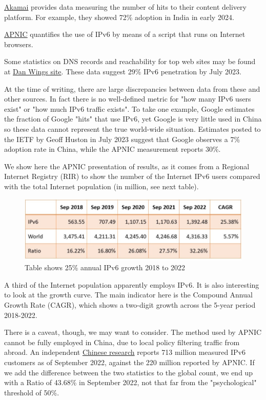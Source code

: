 \documentclass[
]{article}
\begin{document}
\href{https://www.akamai.com/internet-station/cyber-attacks/state-of-the-internet-report/ipv6-adoption-visualization}{Akamai}
provides data measuring the number of hits to their content delivery
platform. For example, they showed 72\% adoption in India in early 2024.

\href{https://stats.labs.apnic.net/ipv6}{APNIC} quantifies the use of
IPv6 by means of a script that runs on Internet browsers.

Some statistics on DNS records and reachability for top web sites may be
found at \href{https://www.employees.org/~dwing/aaaa-stats/}{Dan
Wing\textquotesingle s site}. These data suggest 29\% IPv6 penetration
by July 2023.

At the time of writing, there are large discrepancies between data from
these and other sources. In fact there is no well-defined metric for
"how many IPv6 users exist" or "how much IPv6 traffic exists". To take
one example, Google estimates the fraction of Google "hits" that use
IPv6, yet Google is very little used in China so these data cannot
represent the true world-wide situation. Estimates posted to the IETF by
Geoff Huston in July 2023 suggest that Google observes a 7\% adoption
rate in China, while the APNIC measurement reports 30\%.

We show here the APNIC presentation of results, as it comes from a
Regional Internet Registry (RIR) to show the number of the Internet IPv6
users compared with the total Internet population (in million, see next
table).

\begin{figure}
\centering
\includegraphics{Section5_Table1.jpg}
\caption{Table shows 25\% annual IPv6 growth 2018 to 2022}
\end{figure}

A third of the Internet population apparently employs IPv6. It is also
interesting to look at the growth curve. The main indicator here is the
Compound Annual Growth Rate (CAGR), which shows a two-digit growth
across the 5-year period 2018-2022.

There is a caveat, though, we may want to consider. The method used by
APNIC cannot be fully employed in China, due to local policy filtering
traffic from abroad. An independent
\href{https://www.china-ipv6.cn/\#/activeconnect/simpleInfo}{Chinese
research} reports 713 million measured IPv6 customers as of September
2022, against the 220 million reported by APNIC. If we add the
difference between the two statistics to the global count, we end up
with a Ratio of 43.68\% in September 2022, not that far from the
"psychological" threshold of 50\%.
\end{document}

